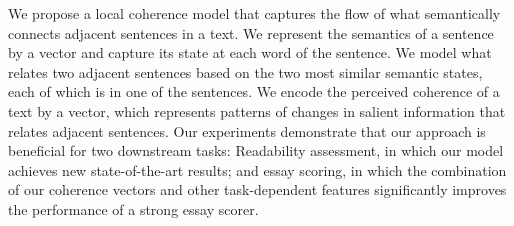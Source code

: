 We propose a local coherence model that captures the flow of what semantically connects adjacent sentences in a text. We represent the semantics of a sentence by a vector and capture its state at each word of the sentence. We model what relates two adjacent sentences based on the two most similar semantic states, each of which is in one of the sentences. We encode the perceived coherence of a text by a vector, which represents patterns of changes in salient information that relates adjacent sentences. Our experiments demonstrate that our approach is beneficial for two downstream tasks: Readability assessment, in which our model achieves new state-of-the-art results; and essay scoring, in which the combination of our coherence vectors and other task-dependent features significantly improves the performance of a strong essay scorer.
